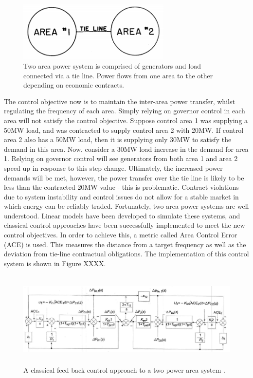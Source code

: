 \documentclass[12pt, a4paper]{article}
\begin{document}
\begin{figure}[h]
	\centering
	\includegraphics[height=3cm]{two_area_system}
	\caption{Two area power system is comprised of generators and load connected via a tie line. Power flows from one area to the other depending on economic contracts.}
\end{figure}

The control objective now is to maintain the inter-area power transfer, whilst regulating the frequency of each area. Simply relying on governor control in each area will not satisfy the control objective. Suppose control area 1 was supplying a 50MW load, and was contracted to supply control area 2 with 20MW. If control area 2 also has a 50MW load, then it is supplying only 30MW to satisfy the demand in this area. Now, consider a 30MW load increase in the demand for area 1. Relying on governor control will see generators from both area 1 and area 2 speed up in response to this step change. Ultimately, the increased power demands will be met, however, the power transfer over the tie line is likely to be less than the contracted 20MW value - this is problematic. Contract violations due to system instability and control issues do not allow for a stable market in which energy can be reliably traded. Fortunately, two area power systems are well understood. Linear models have been developed to simulate these systems, and classical control approaches have been successfully implemented to meet the new control objectives. In order to achieve this, a metric called Area Control Error (ACE) is used. This measures the distance from a target frequency as well as the deviation from tie-line contractual obligations. The implementation of this control system is shown in Figure XXXX.

\begin{figure}[h]
	\centering
	\includegraphics[height=4.8cm]{two_area_control_block}
	\caption{A classical feed back control approach to a two power area system \cite{Kothari2011}.}
\end{figure}
\end{document}
